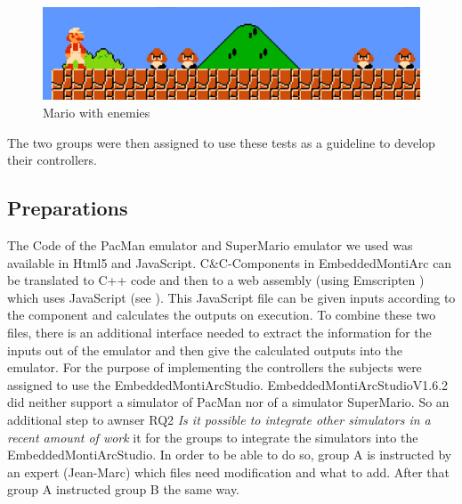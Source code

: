 \begin{figure}[!h]
	\centering
	\includegraphics[scale=0.55]{pictures/Mario4.PNG}
	\caption{Mario with enemies}
	\label{fig:marioFight}
\end{figure}

The two groups were then assigned to use these tests as a guideline to develop their controllers.

\subsection{Preparations}
The Code of the PacMan emulator \cite{pacmanLink} and SuperMario emulator \cite{marioLink} we used was available in Html5 and JavaScript. C\&C-Components in EmbeddedMontiArc can be translated to C++ code and then to a web assembly (using Emscripten \cite{emscirpten}) which uses JavaScript (see \cite{bertram2017component}). This JavaScript file can be given inputs according to the component and calculates the outputs on execution. To combine these two files, there is an additional interface needed to extract the information for the inputs out of the emulator and then give the calculated outputs into the emulator.
For the purpose of implementing the controllers the subjects were assigned to use the EmbeddedMontiArcStudio.
EmbeddedMontiArcStudioV1.6.2 did neither support a simulator of PacMan nor of a simulator SuperMario. So an additional step to awnser RQ2 \textit{Is it possible to integrate other simulators in a recent amount of work} it for the groups to integrate the simulators into the EmbeddedMontiArcStudio.
In order to be able to do so, group A is instructed by an expert (Jean-Marc) which files need modification and what to add. After that group A instructed group B the same way.

